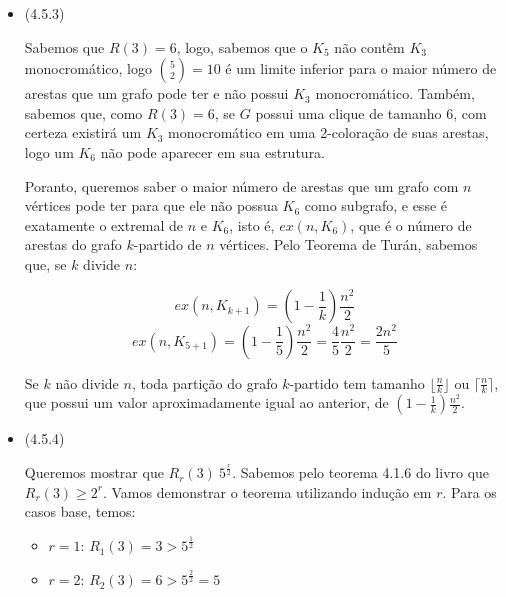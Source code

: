 \documentclass{article}
\begin{document}
\begin{itemize}
\begin{itemize}
	      \end{itemize}
	\item (4.5.3)

	      Sabemos que \(R(3) = 6\), logo, sabemos que o \(K_5\) não contêm \(K_3\) monocromático, logo \(\binom{5}{2} = 10\) é um limite inferior para o maior número de arestas que um grafo
	      pode ter e não possui \(K_3\) monocromático. Também, sabemos que, como \(R(3) = 6\), se \(G\) possui uma clique de tamanho 6, com certeza existirá um \(K_3\) monocromático em uma 2-coloração
	      de suas arestas, logo um \(K_6\) não pode aparecer em sua estrutura.

	      Poranto, queremos saber o maior número de arestas que um grafo com \(n\) vértices pode ter para que ele não possua \(K_6\) como subgrafo, e esse é exatamente o extremal de \(n\) e \(K_6\), isto é, \(ex(n, K_6)\), que é o número de arestas do grafo
	      \(k\)-partido de \(n\) vértices.
	      Pelo Teorema de Turán, sabemos que, se \(k\) divide \(n\):

	      \[ex(n, K_{k+1}) = (1 - \frac{1}{k})\frac{n^2}{2}\]
	      \[ex(n, K_{5+1}) = (1 - \frac{1}{5})\frac{n^2}{2} = \frac{4}{5}\frac{n^2}{2} = \frac{2n^2}{5}\]

	      Se \(k\) não divide \(n\), toda partição do grafo \(k\)-partido tem tamanho \(\lfloor \frac{n}{k} \rfloor\) ou \(\lceil \frac{n}{k} \rceil\), que possui um valor aproximadamente igual ao anterior, de \((1 - \frac{1}{k})\frac{n^2}{2}\).


	\item (4.5.4)

	      Queremos mostrar que \(R_r(3) \> 5^{\frac{r}{2}}\). Sabemos pelo teorema 4.1.6 do livro que \(R_r(3) \geq 2^r\).
	      Vamos demonstrar o teorema utilizando indução em \(r\). Para os casos base, temos:

	      \begin{itemize}
		      \item $r = 1$: $R_1(3) = 3 > 5^{\frac{1}{2}}$
		      \item $r = 2$: $R_2(3) = 6 > 5^{\frac{2}{2}} = 5$
	      \end{itemize}


\end{itemize}
\end{document}
